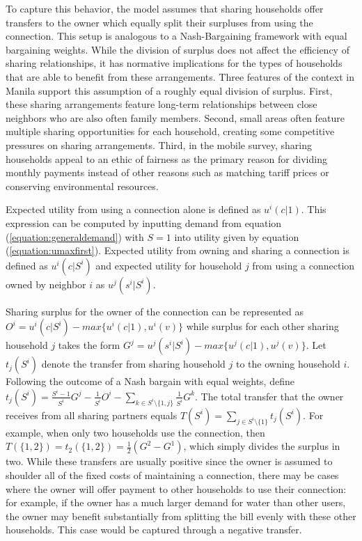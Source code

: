 \documentclass[12pt]{article}
\begin{document}
To capture this behavior, the model assumes that sharing households offer transfers to the owner which equally split their surpluses from using the connection.  This setup is analogous to a Nash-Bargaining framework with equal bargaining weights.  While the division of surplus does not affect the efficiency of sharing relationships, it has normative implications for the types of households that are able to benefit from these arrangements.  Three features of the context in Manila support this assumption of a roughly equal division of surplus.  First, these sharing arrangements feature long-term relationships between close neighbors who are also often family members.  Second, small areas often feature multiple sharing opportunities for each household, creating some competitive pressures on sharing arrangements.  Third, in the mobile survey, sharing households appeal to an ethic of fairness as the primary reason for dividing monthly payments instead of other reasons such as matching tariff prices or conserving environmental resources.

Expected utility from using a connection alone is defined as $u^{i}(c|1)$.  This expression can be computed by inputting demand from equation (\ref{equation:generaldemand}) with $S=1$ into utility given by equation (\ref{equation:umaxfirst}).  Expected utility from owning and sharing a connection is defined as $u^{i}(c| S^i ) $ and expected utility for household $j$ from using a connection owned by neighbor $i$ as $u^{j}(s^{i} |S^i )$.  

Sharing surplus for the owner of the connection can be represented as $ O^{i} = u^{i} ( c | S^{i} ) - max \{ u^{i} (c | 1), u^{i}(v) \} $ while surplus for each other sharing household $j$ takes the form $ G^{j} = u^{j} ( s^{i} | S^{i} ) - max \{ u^{j}(c | 1), u^{j}(v) \} $.  Let $t_{j}(S^{i})$ denote the transfer from sharing household $j$ to the owning household $i$.  Following the outcome of a Nash bargain with equal weights, define $  t_{j}(S^{i}) = \frac{S^{i}-1}{S^{i}} G^{j} - \frac{1}{S^i} O^{i} - \sum_{k \in  S^{i} \setminus \{ 1,j \} } \frac{1}{S^i} G^{k}  $.  The total transfer that the owner receives from all sharing partners equals $T (S^{i}) = \sum_{j \in S^{i} \setminus \{ 1 \} } t_{j} (S^{i})$.  For example, when only two households use the connection, then $T(\{1,2\}) = t_{2}(\{1,2\}) = \frac{1}{2} (G^2 - G^{1})$, which simply divides the surplus in two.  While these transfers are usually positive since the owner is assumed to shoulder all of the fixed costs of maintaining a connection, there may be cases where the owner will offer payment to other households to use their connection: for example, if the owner has a much larger demand for water than other users, the owner may benefit substantially from splitting the bill evenly with these other households.  This case would be captured through a negative transfer.  
\end{document}

